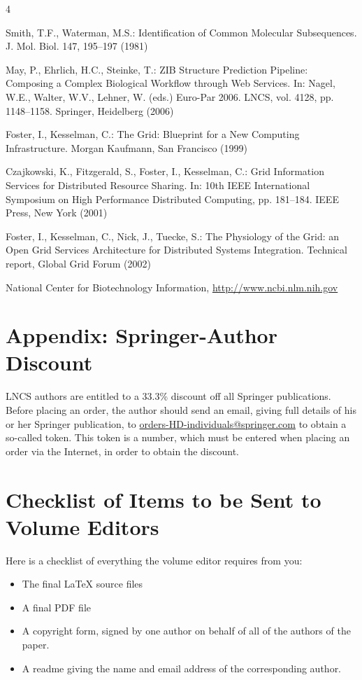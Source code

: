 \documentclass{book}
\begin{document}
\begin{thebibliography}{4}

 Smith, T.F., Waterman, M.S.: Identification of Common Molecular
Subsequences. J. Mol. Biol. 147, 195--197 (1981)

 May, P., Ehrlich, H.C., Steinke, T.: ZIB Structure Prediction Pipeline:
Composing a Complex Biological Workflow through Web Services. In: Nagel,
W.E., Walter, W.V., Lehner, W. (eds.) Euro-Par 2006. LNCS, vol. 4128,
pp. 1148--1158. Springer, Heidelberg (2006)

 Foster, I., Kesselman, C.: The Grid: Blueprint for a New Computing
Infrastructure. Morgan Kaufmann, San Francisco (1999)

 Czajkowski, K., Fitzgerald, S., Foster, I., Kesselman, C.: Grid
Information Services for Distributed Resource Sharing. In: 10th IEEE
International Symposium on High Performance Distributed Computing, pp.
181--184. IEEE Press, New York (2001)

 Foster, I., Kesselman, C., Nick, J., Tuecke, S.: The Physiology of the
Grid: an Open Grid Services Architecture for Distributed Systems
Integration. Technical report, Global Grid Forum (2002)

 National Center for Biotechnology Information, \url{http://www.ncbi.nlm.nih.gov}

\end{thebibliography}


\section*{Appendix: Springer-Author Discount}

LNCS authors are entitled to a 33.3\% discount off all Springer
publications. Before placing an order, the author should send an email, 
giving full details of his or her Springer publication,
to \url{orders-HD-individuals@springer.com} to obtain a so-called token. This token is a
number, which must be entered when placing an order via the Internet, in
order to obtain the discount.

\section{Checklist of Items to be Sent to Volume Editors}
Here is a checklist of everything the volume editor requires from you:


\begin{itemize}
\settowidth{\leftmargin}{{\Large$\square$}}\advance\leftmargin{}
\itemsep8pt\relax
\renewcommand\labelitemi{{\lower1.5pt\hbox{\Large$\square$}}}

\item The final \LaTeX{} source files
\item A final PDF file
\item A copyright form, signed by one author on behalf of all of the
authors of the paper.
\item A readme giving the name and email address of the
corresponding author.
\end{itemize}
\end{document}
